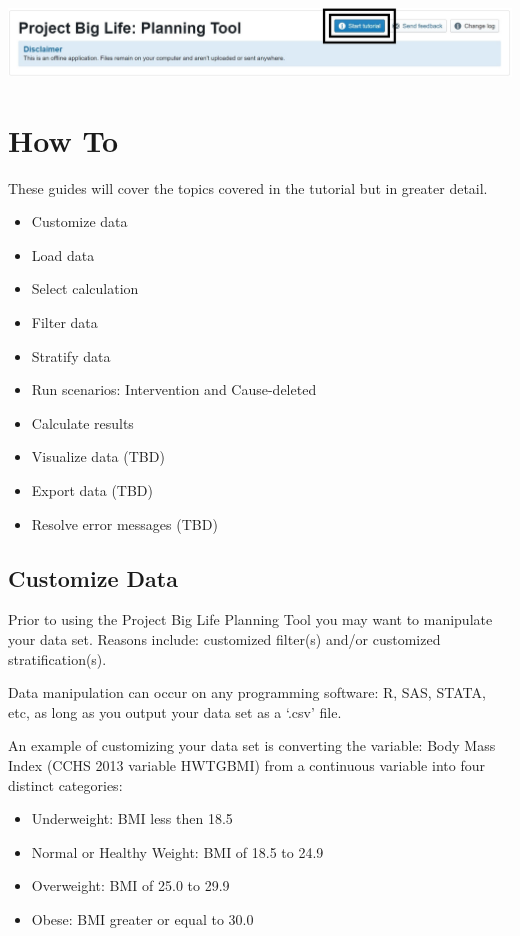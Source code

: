 \documentclass[]{book}
\providecommand{\tightlist}{%
  \setlength{\itemsep}{0pt}\setlength{\parskip}{0pt}}
\begin{document}
\begin{center}\includegraphics{Images/Tutorial Button} \end{center}

\chapter{How To}\label{howto}

These guides will cover the topics covered in the tutorial but in
greater detail.

\begin{itemize}
\tightlist
\item
  Customize data
\item
  Load data
\item
  Select calculation
\item
  Filter data
\item
  Stratify data
\item
  Run scenarios: Intervention and Cause-deleted
\item
  Calculate results
\item
  Visualize data (TBD)
\item
  Export data (TBD)
\item
  Resolve error messages (TBD)
\end{itemize}

\section{Customize Data}\label{customize-data}

Prior to using the Project Big Life Planning Tool you may want to
manipulate your data set. Reasons include: customized filter(s) and/or
customized stratification(s).

Data manipulation can occur on any programming software: R, SAS, STATA,
etc, as long as you output your data set as a `.csv' file.

An example of customizing your data set is converting the variable: Body
Mass Index (CCHS 2013 variable HWTGBMI) from a continuous variable into
four distinct categories:

\begin{itemize}
\tightlist
\item
  Underweight: BMI less then 18.5
\item
  Normal or Healthy Weight: BMI of 18.5 to 24.9
\item
  Overweight: BMI of 25.0 to 29.9
\item
  Obese: BMI greater or equal to 30.0
\end{itemize}
\end{document}
